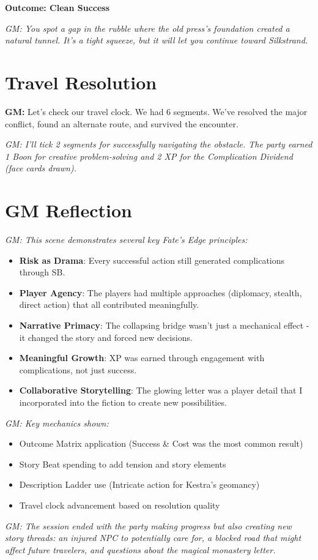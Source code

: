 \documentclass[11pt]{article}
\newcommand{\player}[1]{\textbf{#1:}}
\newcommand{\gm}[1]{\textit{GM: #1}}
\newcommand{\outcome}[1]{\textbf{Outcome: #1}}
\begin{document}
\outcome{Clean Success}

\gm{You spot a gap in the rubble where the old press's foundation created a natural tunnel. It's a tight squeeze, but it will let you continue toward Silkstrand.}

\section*{Travel Resolution}

\player{GM} Let's check our travel clock. We had 6 segments. We've resolved the major conflict, found an alternate route, and survived the encounter.

\gm{I'll tick 2 segments for successfully navigating the obstacle. The party earned 1 Boon for creative problem-solving and 2 XP for the Complication Dividend (face cards drawn).}

\section*{GM Reflection}

\gm{This scene demonstrates several key Fate's Edge principles:}

\begin{itemize}[leftmargin=*]
\item \textbf{Risk as Drama}: Every successful action still generated complications through SB.
\item \textbf{Player Agency}: The players had multiple approaches (diplomacy, stealth, direct action) that all contributed meaningfully.
\item \textbf{Narrative Primacy}: The collapsing bridge wasn't just a mechanical effect - it changed the story and forced new decisions.
\item \textbf{Meaningful Growth}: XP was earned through engagement with complications, not just success.
\item \textbf{Collaborative Storytelling}: The glowing letter was a player detail that I incorporated into the fiction to create new possibilities.
\end{itemize}

\gm{Key mechanics shown:}
\begin{itemize}[leftmargin=*]
\item Outcome Matrix application (Success \& Cost was the most common result)
\item Story Beat spending to add tension and story elements
\item Description Ladder use (Intricate action for Kestra's geomancy)
\item Travel clock advancement based on resolution quality
\end{itemize}

\gm{The session ended with the party making progress but also creating new story threads: an injured NPC to potentially care for, a blocked road that might affect future travelers, and questions about the magical monastery letter.}
\end{document}
